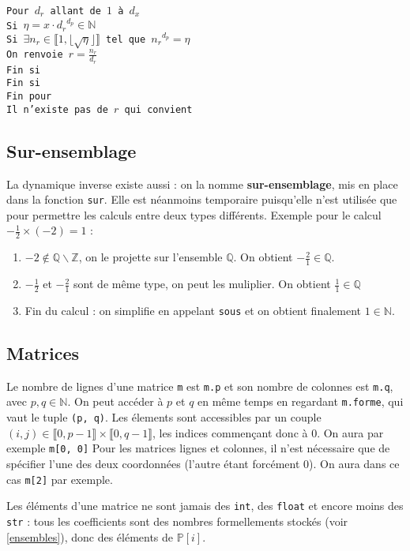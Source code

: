 \documentclass[french]{article}
\newcommand{\p}{\texttt} %
\newcommand{\tab}{\hspace*{5mm}}
\newcommand{\floor}[1]{\lfloor #1 \rfloor} %
\begin{document}
\noindent\texttt{Pour $d_r$ allant de $1$ à $d_x$ \\
\tab Si $\eta = x \cdot {d_r}^{d_p} \in \mathbb{N}$ \\
\tab\tab Si $\exists n_r \in \llbracket 1, \floor{\sqrt{\eta}} \rrbracket$ tel que ${n_r}^{d_p} = \eta$ \\
\tab\tab\tab On renvoie $r = \frac{n_r}{d_r}$ \\
\tab\tab Fin si \\
\tab Fin si \\
Fin pour\\
Il n'existe pas de $r$ qui convient}


\subsection{Sur-ensemblage}

La dynamique inverse existe aussi : on la nomme \textbf{sur-ensemblage}, mis en place dans la fonction \p{sur}. Elle est néanmoins temporaire puisqu'elle n'est utilisée que pour permettre les calculs entre deux types différents.
Exemple pour le calcul $-\frac{1}{2} \times (-2) = 1$ :
\begin{enumerate}
  \item $-2 \not\in \mathbb{Q} \backslash \mathbb{Z} $, on le projette sur l'ensemble $\mathbb{Q}$. On obtient $-\frac{2}{1} \in \mathbb{Q}$.
  \item $-\frac{1}{2}$ et $-\frac{2}{1}$ sont de même type, on peut les muliplier. On obtient $\frac{1}{1} \in \mathbb{Q}$
  \item Fin du calcul : on simplifie en appelant \p{sous} et on obtient finalement $1 \in \mathbb{N}$.
\end{enumerate}

\subsection{Matrices}

Le nombre de lignes d'une matrice \p{m} est \p{m.p} et son nombre de colonnes est \p{m.q}, avec $p, q \in \mathbb{N}$. On peut accéder à $p$ et $q$ en même temps en regardant \p{m.forme}, qui vaut le tuple \p{(p, q)}. Les élements sont accessibles par un couple $(i, j) \in \llbracket 0, p -1 \rrbracket \times \llbracket 0, q -1 \rrbracket$, les indices commençant donc à 0. On aura par exemple \p{m[0, 0]} Pour les matrices lignes et colonnes, il n'est nécessaire que de spécifier l'une des deux coordonnées (l'autre étant forcément 0). On aura dans ce cas \p{m[2]} par exemple.

Les éléments d'une matrice ne sont jamais des \p{int}, des \p{float} et encore moins des \p{str} : tous les coefficients sont des nombres formellements stockés (voir \ref{ensembles}), donc des éléments de $\mathbb{P}[i]$.
\end{document}
